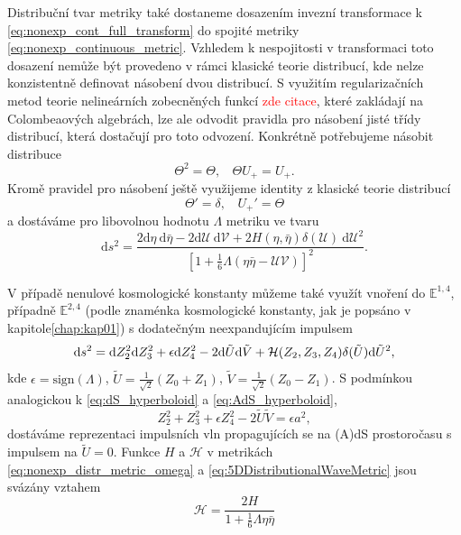 Distribuční tvar metriky také dostaneme dosazením invezní transformace k \eqref{eq:nonexp_cont_full_transform} do spojité metriky 
\eqref{eq:nonexp_continuous_metric}. Vzhledem k nespojitosti v transformaci toto dosazení nemůže být provedeno
v rámci klasické teorie distribucí, kde nelze konzistentně definovat násobení dvou distribucí. S využitím regularizačních metod teorie
nelineárních zobecněných funkcí \textcolor{red}{zde citace}, které zakládají na Colombeaových algebrách, lze ale odvodit pravidla pro násobení
jisté třídy distribucí, která dostačují pro toto odvození. Konkrétně potřebujeme násobit distribuce
\begin{equation}
        \Theta^2 = \Theta, ~~~~ \Theta U_{+} = U_{+}.
\end{equation}
Kromě pravidel pro násobení ještě využijeme identity z klasické teorie distribucí
\begin{equation}
    \Theta' = \delta, ~~~~ U_{+}' = \Theta
\end{equation}
a dostáváme pro libovolnou hodnotu $\Lambda$ metriku ve tvaru
\begin{equation} \label{eq:nonexp_distr_metric_omega}
\mathrm{d}s^2=\frac{2\mathrm{d}\eta~\mathrm{d}\bar{\eta} - 2 \mathrm{d}\mathcal{U}~\mathrm{d}\mathcal{V} + 2H(\eta, \bar{\eta}) \delta(\mathcal{U}) 
~\mathrm{d}\mathcal{U}^2}{\left[1+\frac{1}{6}\Lambda(\eta \bar{\eta}-\mathcal{U}\mathcal{V})\right]^2}.
\end{equation}

V případě nenulové kosmologické konstanty můžeme také využít vnoření do $\mathbb{E}^{1,4}$, případně $\mathbb{E}^{2,4}$ (podle znaménka kosmologické
konstanty, jak je popsáno v kapitole\autoref{chap:kap01}) s dodatečným neexpandujícím impulsem
\begin{equation}
    \label{eq:5DDistributionalWaveMetric}
    \mathrm{d} s^2 = \mathrm{d} Z_2^2 \mathrm{d} Z_3^2 + \epsilon \mathrm{d} Z_4^2 - 2 \mathrm{d} \tilde{U} \mathrm{d} \tilde{V} + \mathcal{H}(Z_2, Z_3, Z_4) \delta(\tilde{U}) \mathrm{d} \tilde{U}^2,
\end{equation}
kde $\epsilon = \text{sign} (\Lambda)$, $\tilde{U} = \tfrac{1}{\sqrt{2}}(Z_0 + Z_1)$, $\tilde{V}= \tfrac{1}{\sqrt{2}}(Z_0-Z_1)$.
S podmínkou analogickou k \eqref{eq:dS_hyperboloid} a \eqref{eq:AdS_hyperboloid},
\begin{equation}
    Z_2^2 + Z_3^2 + \epsilon Z_4^2 - 2 \tilde{U} \tilde{V} = \epsilon a^2,
\end{equation}
dostáváme reprezentaci impulsních vln propagujících se na (A)dS prostoročasu s impulsem na $\tilde{U}=0$. 
Funkce $H$ a $\mathcal{H}$ v metrikách \eqref{eq:nonexp_distr_metric_omega} a \eqref{eq:5DDistributionalWaveMetric} jsou svázány vztahem
\begin{equation}
    \mathcal{H} = \frac{2H}{1+\frac{1}{6}\Lambda \eta \bar{\eta}}
\end{equation}


